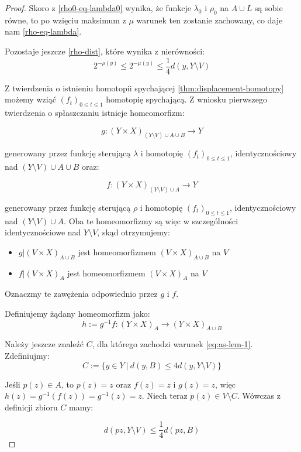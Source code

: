\begin{lem}
\begin{proof}
    Skoro z \eqref{rho0-eq-lambda0} wynika, że funkcje $\lambda_0$ i $\rho_0$ na $A \cup L$ są sobie równe, to po wzięciu maksimum z $\mu$ warunek ten zostanie zachowany, co daje nam \eqref{rho-eq-lambda}.
    
    Pozostaje jeszcze \eqref{rho-dist}, które wynika z nierówności:
    \[2^{-\rho(y)} \leq 2^{-\mu(y)} \leq \frac{1}{4} d(y, Y \setminus V)\]
    
    Z twierdzenia o istnieniu homotopii spychającej \ref{thm:displacement-homotopy} możemy wziąć $(f_t)_{0 \leq t \leq 1}$ homotopię spychającą.
    Z wniosku pierwszego twierdzenia o spłaszczaniu istnieje homeomorfizm:
    
    \[g: (Y \times X)_{(Y \setminus V) \cup A \cup B} \rightarrow Y\]
    
    generowany przez funkcję sterującą $\lambda$ i homotopię $(f_t)_{0 \leq t \leq 1}$, identycznościowy nad $(Y \setminus V) \cup A \cup B$ oraz:
    
    \[f: (Y \times X)_{(Y \setminus V) \cup A} \rightarrow Y\]
    
    generowany przez funkcję sterującą $\rho$ i homotopię $(f_t)_{0 \leq t \leq 1}$, identycznościowy nad $(Y \setminus V) \cup A$. Oba te homeomorfizmy są więc w szczególności identycznościowe nad $Y \setminus V$, skąd otrzymujemy:
    
    \begin{itemize}
     \item $g|(V \times X)_{A \cup B}$ jest homeomorfizmem $(V \times X)_{A \cup B}$ na $V$
     \item $f|(V \times X)_{A}$ jest homeomorfizmem $(V \times X)_{A}$ na $V$
    \end{itemize}

    Oznaczmy te zawężenia odpowiednio przez $g$ i $f$.
    
    Definiujemy żądany homeomorfizm jako:
    \[h := g^{-1} f: (Y \times X)_{A} \rightarrow (Y \times X)_{A \cup B}\]
    
    Należy jeszcze znaleźć $C$, dla którego zachodzi warunek \eqref{eq:as-lem-1}. Zdefiniujmy:
    \[C := \{y \in Y\ |\ d(y,B) \leq 4 d(y, Y \setminus V)\}\]
    
    Jeśli $p(z) \in A$, to $p(z) = z$ oraz $f(z) = z$ i $g(z) = z$, więc $h(z) = g^{-1}(f(z)) = g^{-1}(z) = z$. Niech teraz $p(z) \in V \setminus C$. Wówczas z definicji zbioru $C$ mamy:
    
    \begin{equation}
      \label{dist-pz-YV} d(pz, Y \setminus V) \leq \frac{1}{4} d(pz, B)
    \end{equation}
    

\end{proof}
\end{lem}
